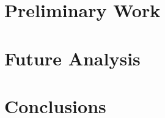\documentclass[%
 reprint, %
 amsmath,amssymb,
 aps,
 prc
]{revtex4-1}
\begin{document}

\section{Preliminary Work}
\label{Current_Work} 



\section{Future Analysis}
\label{future_analysis}



\section{Conclusions}
\label{sec:Conclusions}



\clearpage %

%
\end{document}
